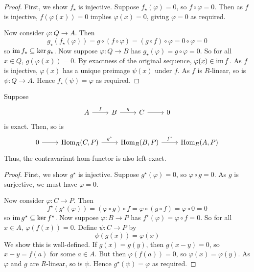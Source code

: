 \begin{proof}
    First, we show \( f_\star \) is injective.
    Suppose \( f_\star(\varphi) = 0 \), so \( f \circ \varphi = 0 \).
    Then as \( f \) is injective, \( f(\varphi(x)) = 0 \) implies \( \varphi(x) = 0 \), giving \( \varphi = 0 \) as required.

    Now consider \( \varphi : Q \to A \).
    Then
    \[ g_\star (f_\star(\varphi)) = g \circ (f \circ \varphi) = (g \circ f) \circ \varphi = 0 \circ \varphi = 0 \]
    so \( \operatorname{im} f_\star \subseteq \ker g_\star \).
    Now suppose \( \varphi : Q \to B \) has \( g_\star(\varphi) = g \circ \varphi = 0 \).
    So for all \( x \in Q \), \( g(\varphi(x)) = 0 \).
    By exactness of the original sequence, \( \varphi(x) \in \operatorname{im} f \).
    As \( f \) is injective, \( \varphi(x) \) has a unique preimage \( \psi(x) \) under \( f \).
    As \( f \) is \( R \)-linear, so is \( \psi : Q \to A \).
    Hence \( f_\star(\psi) = \varphi \) as required.
\end{proof}
\begin{proposition}
    Suppose
    \[\begin{tikzcd}
        A & B & C & 0
        \arrow["f", from=1-1, to=1-2]
        \arrow["g", from=1-2, to=1-3]
        \arrow[from=1-3, to=1-4]
    \end{tikzcd}\]
    is exact.
    Then, so is
    \[\begin{tikzcd}
        0 & {\Hom_R(C, P)} & {\Hom_R(B, P)} & {\Hom_R(A, P)}
        \arrow[from=1-1, to=1-2]
        \arrow["{g^\star}", from=1-2, to=1-3]
        \arrow["{f^\star}", from=1-3, to=1-4]
    \end{tikzcd}\]
    Thus, the contravariant hom-functor is also left-exact.
\end{proposition}
\begin{proof}
    First, we show \( g^\star \) is injective.
    Suppose \( g^\star(\varphi) = 0 \), so \( \varphi \circ g = 0 \).
    As \( g \) is surjective, we must have \( \varphi = 0 \).

    Now consider \( \varphi : C \to P \).
    Then
    \[ f^\star(g^\star(\varphi)) = (\varphi \circ g) \circ f = \varphi \circ (g \circ f) = \varphi \circ 0 = 0 \]
    so \( \operatorname{im} g^\star \subseteq \ker f^\star \).
    Now suppose \( \varphi : B \to P \) has \( f^\star(\varphi) = \varphi \circ f = 0 \).
    So for all \( x \in A \), \( \varphi(f(x)) = 0 \).
    Define \( \psi : C \to P \) by
    \[ \psi(g(x)) = \varphi(x) \]
    We show this is well-defined.
    If \( g(x) = g(y) \), then \( g(x - y) = 0 \), so \( x - y = f(a) \) for some \( a \in A \).
    But then \( \varphi(f(a)) = 0 \), so \( \varphi(x) = \varphi(y) \).
    As \( \varphi \) and \( g \) are \( R \)-linear, so is \( \psi \).
    Hence \( g^\star(\psi) = \varphi \) as required.
\end{proof}
